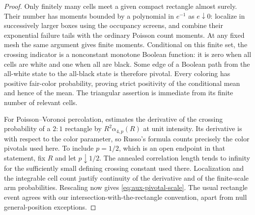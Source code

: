 \begin{proof}
Only finitely many cells meet a given compact rectangle almost
surely.  Their number has moments bounded by a polynomial in $e^{-1}$
as $e\downarrow0$: localize in successively larger boxes using the
occupancy screens, and combine their exponential failure tails with
the ordinary Poisson count moments.  At any fixed mesh the same
argument gives finite moments.  Conditional on this finite set, the
crossing indicator is a nonconstant monotone Boolean function: it
is zero when all cells are white and one when all are black.  Some
edge of a Boolean path from the all-white state to the all-black
state is therefore pivotal.  Every coloring has positive fair-color
probability, proving strict positivity of the conditional mean and
hence of the mean.  The triangular assertion is immediate from its
finite number of relevant cells.

For Poisson--Voronoi percolation,
\cite[Lemma~6.1 and equation~(6.1)]{vanneuville-scaling} estimates
the derivative of the crossing probability of a $2:1$ rectangle by
$R^2\alpha_{4,p}(R)$ at unit intensity.  Its derivative is with
respect to the color parameter, so Russo's formula counts precisely
the color pivotals used here.  To include $p=1/2$, which is an open
endpoint in that statement, fix $R$ and let $p\downarrow1/2$.
The annealed correlation length tends to infinity for the sufficiently
small defining crossing constant used there.  Localization and the
integrable cell count justify continuity of the derivative and of
the finite-scale arm probabilities.  Rescaling now gives
\eqref{eq:aux-pivotal-scale}.  The usual rectangle event agrees with
our intersection-with-the-rectangle convention, apart from null
general-position exceptions.


\end{proof}
